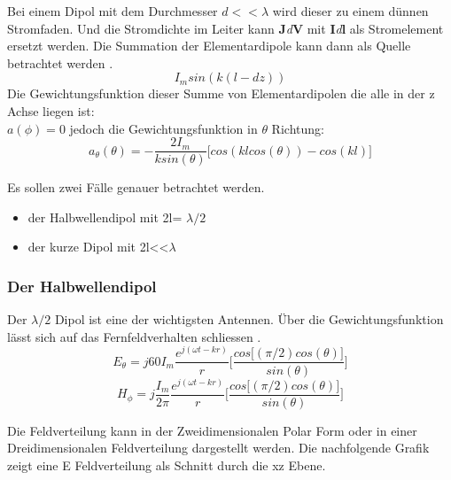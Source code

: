 Bei einem Dipol mit dem Durchmesser $d<<\lambda$ wird dieser zu einem dünnen Stromfaden. Und die Stromdichte im Leiter kann \textbf{J}\textit{d}\textbf{\textbf{V}} mit \textbf{I}\textit{d}\textbf{\textbf{l}} als Stromelement ersetzt werden. Die Summation der Elementardipole kann dann als Quelle betrachtet werden \cite{elliott1981antenna}.\\

\begin{equation}
I_{m}sin(k(l-dz))
\end{equation}
Die Gewichtungsfunktion dieser Summe von Elementardipolen die alle in der z Achse liegen ist:\\
$a(\phi)= 0$
jedoch die Gewichtungsfunktion in $\theta$ Richtung:
\begin{equation}
a_{\theta}(\theta)=- \frac{2I_{m}}{k sin(\theta)} \lbrack cos(kl cos(\theta)) - cos(kl) \rbrack
\end{equation}

Es sollen zwei Fälle genauer betrachtet werden.
\begin{itemize}
\item der Halbwellendipol mit 2l= $\lambda/2$
\item der kurze Dipol mit 2l<<$\lambda$
\end{itemize}
\subsubsection{Der Halbwellendipol}
Der $\lambda/2$ Dipol ist eine der wichtigsten Antennen. Über die Gewichtungsfunktion lässt sich auf das Fernfeldverhalten schliessen \cite{elliott1981antenna}.
\begin{equation}
E_{\theta}=j60I_{m} \frac{e^{j(\omega t - kr)}}{r} \lbrack \frac{cos\lbrack  (\pi/2) cos(\theta)\rbrack}{sin(\theta)} \rbrack
\end{equation}
\begin{equation}
H_{\phi}=j \frac{I_{m}}{2\pi} \frac{e^{j(\omega t - kr)}}{r} \lbrack \frac{cos\lbrack  (\pi/2) cos(\theta)\rbrack}{sin(\theta)} \rbrack
\end{equation}

Die Feldverteilung kann in der  Zweidimensionalen Polar Form oder in einer Dreidimensionalen Feldverteilung dargestellt werden.
Die nachfolgende Grafik zeigt eine E Feldverteilung als Schnitt durch die xz Ebene.\\

